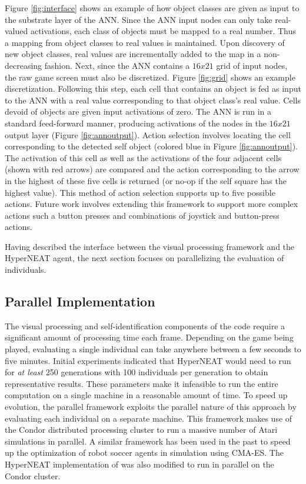 \documentclass{acm_proc_article-sp}
\begin{document}
Figure \ref{fig:interface} shows an example of how object classes are given as input to the substrate layer of the ANN. Since the ANN input nodes can only take real-valued activations, each class of objects must be mapped to a real number. Thus a mapping from object classes to real values is maintained. Upon discovery of new object classes, real values are incrementally added to the map in a non-decreasing fashion. Next, since the ANN contains a $16x21$ grid of input nodes, the raw game screen must also be discretized. Figure \ref{fig:grid} shows an example discretization. Following this step, each cell that contains an object is fed as input to the ANN with a real value corresponding to that object class's real value. Cells devoid of objects are given input activations of zero. The ANN is run in a standard feed-forward manner, producing activations of the nodes in the $16x21$ output layer (Figure \ref{fig:annoutput}). Action selection involves locating the cell corresponding to the detected self object (colored blue in Figure \ref{fig:annoutput}). The activation of this cell as well as the activations of the four adjacent cells (shown with red arrows) are compared and the action corresponding to the arrow in the highest of these five cells is returned (or no-op if the self square has the highest value). This method of action selection supports up to five possible actions. Future work involves extending this framework to support more complex actions such a button presses and combinations of joystick and button-press actions.

Having described the interface between the visual processing framework and the HyperNEAT agent, the next section focuses on parallelizing the evaluation of individuals.

\subsection{Parallel Implementation}
\label{sec:condor}
The visual processing and self-identification components of the code require a significant amount of processing time each frame. Depending on the game being played, evaluating a single individual can take anywhere between a few seconds to five minutes. Initial experiments indicated that HyperNEAT would need to run for \textit{at least} 250 generations with 100 individuals per generation to obtain representative results. These parameters make it infeasible to run the entire computation on a single machine in a reasonable amount of time. To speed up evolution, the parallel framework exploits the parallel nature of this approach by evaluating each individual on a separate machine. This framework makes use of the Condor distributed processing cluster \cite{thain2005distributed} to run a massive number of Atari simulations in parallel. A similar framework has been used in the past to speed up the optimization of robot soccer agents in simulation using CMA-ES\cite{Urieli+MKBS:2010}. The HyperNEAT implementation of \cite{verbancsics10} was also modified to run in parallel on the Condor cluster.
\end{document}
